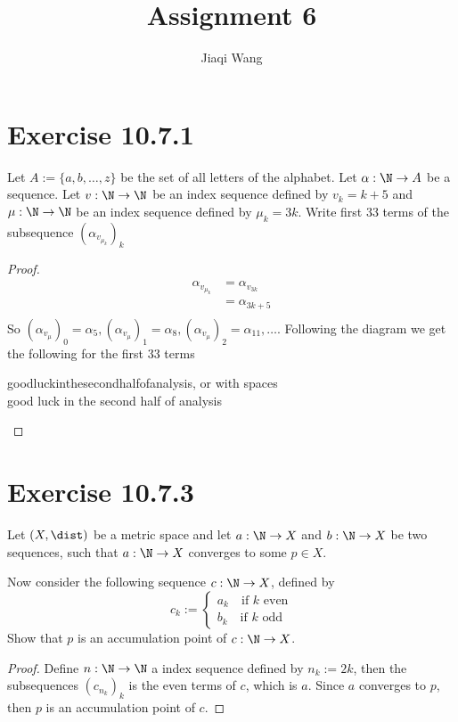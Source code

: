 \documentclass{article}
\title{Assignment 6}
\author{Jiaqi Wang }
\begin{document}
    \maketitle

    \section{Exercise 10.7.1}
    \begin{problem}
        Let $A := \{a,b,\dots,z\}$ be the set of all letters of the alphabet. Let $\alpha: \N \to A$ be a sequence.
        Let $v: \N \to \N$ be an index sequence defined by $v_k = k+5$ and $\mu: \N \to \N$ be an index sequence defined by $\mu_k = 3k$.
        Write first 33 terms of the subsequence $(\alpha_{v_{\mu_k}})_k$
    \end{problem}
    \begin{proof}[Proof]
        \begin{align*}
            \alpha_{v_{\mu_k}} &= \alpha_{v_{3k}} \\
            &= \alpha_{3k+5} \\
        \end{align*}
        So $(\alpha_{v_\mu})_0 = \alpha_5, (\alpha_{v_\mu})_1 = \alpha_8, (\alpha_{v_\mu})_2 = \alpha_{11}, \dots$. Following the diagram we get the following for the first 33 terms
        \begin{center}
            goodluckinthesecondhalfofanalysis, or with spaces \\
            good luck in the second half of analysis
        \end{center}
    \end{proof}

    \section{Exercise 10.7.3}
    \begin{problem}
        Let $(X, \dist)$ be a metric space and let $a : \N \to X$ and
        $b : \N \to X$ be two sequences, such that $a : \N \to X$ converges to some $p \in X$.

        Now consider the following sequence $c : \N \to X$, defined by
        $$c_k := \begin{cases} a_k \quad \text{if } k \text{ even}\\ b_k \quad \text{if } k \text{ odd}\end{cases}$$
        Show that $p$ is an accumulation point of $c : \N \to X$.
    \end{problem}
    \begin{proof}[Proof]
        Define $n: \N \to \N$ a index sequence defined by $n_k := 2k$, then the subsequences $(c_{n_k})_k$ is the even terms of $c$, which is $a$. Since $a$ converges to $p$, then $p$ is an accumulation point of $c$.
    \end{proof}
\end{document}
